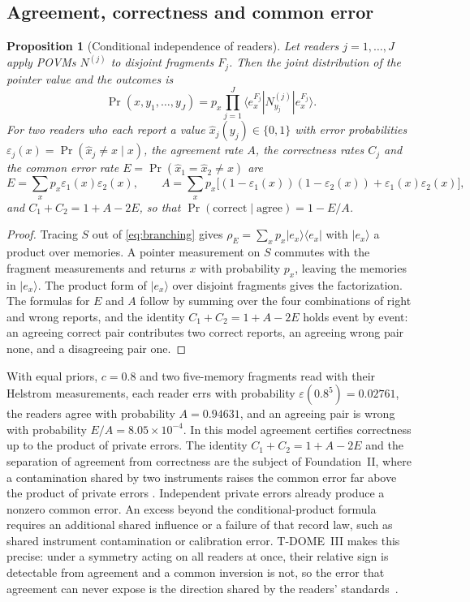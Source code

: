 \documentclass[12pt,a4paper]{article}
\newtheorem{proposition}[theorem]{Proposition}
\begin{document}
\subsection{Agreement, correctness and common error}

\begin{proposition}[Conditional independence of readers]
\label{prop:independence}
Let readers $j=1,\dots,J$ apply POVMs $N^{(j)}$ to disjoint fragments $F_j$. Then the joint distribution of the pointer value and the outcomes is
\[
\Pr(x,y_1,\dots,y_J)=p_x\prod_{j=1}^J\langle e_x^{F_j}|N^{(j)}_{y_j}|e_x^{F_j}\rangle .
\]
For two readers who each report a value $\hat x_j(y_j)\in\{0,1\}$ with error probabilities $\varepsilon_j(x)=\Pr(\hat x_j\ne x\mid x)$, the agreement rate $A$, the correctness rates $C_j$ and the common error rate $E=\Pr(\hat x_1=\hat x_2\ne x)$ are
\[
E=\sum_xp_x\varepsilon_1(x)\varepsilon_2(x),\qquad
A=\sum_xp_x\bigl[(1-\varepsilon_1(x))(1-\varepsilon_2(x))+\varepsilon_1(x)\varepsilon_2(x)\bigr],
\]
and $C_1+C_2=1+A-2E$, so that $\Pr(\text{correct}\mid\text{agree})=1-E/A$.
\end{proposition}

\begin{proof}
Tracing $S$ out of \eqref{eq:branching} gives $\rho_{E}=\sum_xp_x|e_x\rangle\langle e_x|$ with $|e_x\rangle$ a product over memories. A pointer measurement on $S$ commutes with the fragment measurements and returns $x$ with probability $p_x$, leaving the memories in $|e_x\rangle$. The product form of $|e_x\rangle$ over disjoint fragments gives the factorization. The formulas for $E$ and $A$ follow by summing over the four combinations of right and wrong reports, and the identity $C_1+C_2=1+A-2E$ holds event by event: an agreeing correct pair contributes two correct reports, an agreeing wrong pair none, and a disagreeing pair one.
\end{proof}

With equal priors, $c=0.8$ and two five-memory fragments read with their Helstrom measurements, each reader errs with probability $\varepsilon(0.8^5)=0.02761$, the readers agree with probability $A=0.94631$, and an agreeing pair is wrong with probability $E/A=8.05\times10^{-4}$. In this model agreement certifies correctness up to the product of private errors. The identity $C_1+C_2=1+A-2E$ and the separation of agreement from correctness are the subject of Foundation~II, where a contamination shared by two instruments raises the common error far above the product of private errors \cite{FoundationII}. Independent private errors already produce a nonzero common error. An excess beyond the conditional-product formula requires an additional shared influence or a failure of that record law, such as shared instrument contamination or calibration error. T-DOME~III makes this precise: under a symmetry acting on all readers at once, their relative sign is detectable from agreement and a common inversion is not, so the error that agreement can never expose is the direction shared by the readers' standards~\cite{Liu2026TDOME_III}.
\end{document}
